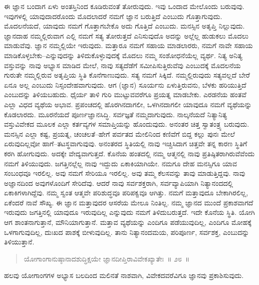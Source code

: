 ಈ ಜ್ಞಾನ ಬಂದಾಗ ಏಳು ಅಂತಸ್ತಿನಿಂದ ಕೂಡಿರುವಂತೆ ತೋರುವುದು. ಇವು ಒಂದಾದ ಮೇಲೊಂದು ಬರುವುವು. ಇವುಗಳಲ್ಲಿ ಯಾವುದಾದರೊಂದು ಮೊದಲಾದರೆ ನಮಗೆ ಜ್ಞಾನ ಬರುತ್ತಿದೆ ಎಂಬುದು ಗೊತ್ತಾಗುವುದು. ಮೊದಲನೆಯದೆ, ಯಾವುದು ನಮಗೆ ಗೊತ್ತಾಗಬೇಕೊ ಅದು ಗೊತ್ತಿದೆ ಎಂಬುದು. ಮನಸ್ಸಿನ ಅತೃಪ್ತಿ ನಿಲ್ಲುವುದು. ಜ್ಞಾನದಾಹ ನಮ್ಮಲ್ಲಿರುವಾಗ ಎಲ್ಲಿ ನಮಗೆ ಸತ್ಯ ತೋರುತ್ತದೆ ಎನಿಸುವುದೊ ಅದನ್ನು ಅಲ್ಲೆಲ್ಲ ಹುಡುಕಲು ಮೊದಲು ಮಾಡುವೆವು. ಜ್ಞಾನ ನಮ್ಮಲ್ಲಿಯೇ ಇರುವುದು. ಮತ್ತಾರೂ ನಮಗೆ ಸಹಾಯ ಮಾಡಲಾರರು, ನಮಗೆ ನಾವೇ ಸಹಾಯ ಮಾಡಿಕೊಳ್ಳಬೇಕು–ಎನ್ನುವುದನ್ನು ತಿಳಿದುಕೊಳ್ಳುವುದಕ್ಕೆ ಮೊದಲು ನಮ್ಮ ಸಂಶೋಧನೆಯೆಲ್ಲ ವ್ಯರ್ಥ. ನಿತ್ಯ ಅನಿತ್ಯ ವಸ್ತುವನ್ನು ನಾವು ಅಭ್ಯಾಸ ಮಾಡಿದ ಮೇಲೆ, ನಾವು ಸತ್ಯದೆಡೆಗೆ ಸಮೀಪಿಸುತ್ತಿರುವೆವು ಎಂಬುದಕ್ಕೆ ಮೊದಲನೆಯ ಗುರುತೇ ನಮ್ಮಲ್ಲಿರುವ ಅತೃಪ್ತಿಯ ಸ್ಥಿತಿ ಕೊನೆಗಾಣುವುದು. ಸತ್ಯ ನಮಗೆ ಸಿಕ್ಕಿದೆ. ನಮ್ಮಲ್ಲಿರುವುದು ಸತ್ಯವಲ್ಲದೆ ಬೇರೆ ಏನೂ ಅಲ್ಲ ಎಂಬುದು ನಿಸ್ಸಂದೇಹವಾಗುವುದು. ಆಗ (ಜ್ಞಾನ) ಸೂರ್ಯನು ಏಳುತ್ತಿರುವನು, ಬೆಳಕು ಹರಿಯುತ್ತಿದೆ ಎಂಬುದನ್ನು ತಿಳಿಯಬಹುದು. ಧೈರ್ಯ ತಾಳಿ ಗುರಿ ಮುಟ್ಟುವವರೆಗೂ ಪ್ರಯತ್ನ ಮಾಡಬೇಕು. ಎರಡನೆಯ ಹಂತವೆ ಎಲ್ಲಾ ವಿಧದ ವ್ಯಥೆಯ ಅಭಾವ. ಪ್ರಪಂಚದಲ್ಲಿ ಹೊರಗಿನದಾಗಲೀ, ಒಳಗಿನದಾಗಲೀ ಯಾವುದೂ ನಮಗೆ ವ್ಯಥೆಯನ್ನು ಕೊಡಲಾರದು. ಮೂರನೆಯದೆ ಪೂರ್ಣಜ್ಞಾನಸಿದ್ಧಿ. ಸರ್ವಜ್ಞತೆ ನಮ್ಮದಾಗುವುದು. ನಾಲ್ಕನೆಯದೆ ನಿತ್ಯಾನಿತ್ಯ ವಸ್ತುವಿವೇಕದ ಮೂಲಕ ಎಲ್ಲಾ ಕರ್ತವ್ಯಗಳ ಸಮಾಪ್ತಿಯನ್ನು ಹೊಂದುವುದು. ಅನಂತರ ಚಿತ್ತ ಸ್ವಾತಂತ್ರ್ಯ ಬರುವುದು. ಮನಸ್ಸಿನ ಎಲ್ಲಾ ಕಷ್ಟ, ಪ್ರಯತ್ನ, ಚಂಚಲತೆ–ಹೇಗೆ ಪರ್ವತದ ಮೇಲಿನಿಂದ ಕಣಿವೆಗೆ ಬಿದ್ದ ಕಲ್ಲು ಪುನಃ ಮೇಲೆ ಏರುವುದಿಲ್ಲವೋ ಹಾಗೆ–ತಟಸ್ಥವಾಗುವುವು. ಅನಂತರದ ಸ್ಥಿತಿಯಲ್ಲಿ ನಾವು ಇಚ್ಚಿಸಿದಾಗ ಚಿತ್ತವೇ ತನ್ನ ಕಾರಣ ಸ್ಥಿತಿಗೆ ಕರಗಿ ಹೋಗುವುದು. ಅದಕ್ಕೇ ವೇದ್ಯವಾಗುತ್ತದೆ. ಕೊನೆಯ ಹಂತದಲ್ಲಿ ನಮ್ಮ ಆತ್ಮನಲ್ಲಿ ನಾವು ಪ್ರತಿಷ್ಠಿತರಾಗಿರುವೆವೆಂದು ನಮಗೆ ತಿಳಿಯುವುದು. ಜಗತ್ತಿನಲ್ಲೆಲ್ಲ ನಾವು ಇದ್ದುದು ಏಕಾಕಿಯಾಗಿಯೇ. ನಮಗೂ ದೇಹ ಮನಸ್ಸಿಗೂ ಯಾವ ಸಂಬಂಧವೂ ಇರಲಿಲ್ಲ. ಅವು ನಮಗೆ ಸೇರಿಯೂ ಇರಲಿಲ್ಲ. ಅವು ತಮ್ಮ ಕೆಲಸವನ್ನು ತಾವು ಮಾಡುತ್ತಿದ್ದವು. ನಾವು ಅಜ್ಞಾನದಿಂದ ಅವುಗಳೊಂದಿಗೆ ಸೇರಿದೆವು. ಆದರೆ ನಾವು ಸರ್ವಶಕ್ತರಾಗಿ, ಸರ್ವವ್ಯಾಪಿಯಾಗಿ ನಿತ್ಯಾನಂದದಲ್ಲಿ ಏಕಾಕಿಗಳಾಗಿದ್ದೆವು. ನಮ್ಮ ಸ್ವಂತ ಆತ್ಮವೇ ಪರಿಶುದ್ಧವೂ ಪರಿಪಕ್ವವೂ ಆಗಿತ್ತು. ನಮಗೆ ಮತ್ತಾವುದೂ ಬೇಕಾಗಿರಲಿಲ್ಲ, ಏಕೆಂದರೆ ನಾವೆ ಸೌಖ್ಯ. ಈ ಜ್ಞಾನ ಮತ್ತಾವುದರ ಆಸರೆಯ ಮೇಲೂ ನಿಂತಿಲ್ಲ. ನಮ್ಮ ಜ್ಞಾನದ ಮುಂದೆ ಪ್ರಕಾಶವಾಗದೆ ಇರುವುದು ಜಗತ್ತಿನಲ್ಲಿ ಯಾವುದೂ ಇರುವುದಿಲ್ಲ ಎನ್ನುವುದು ನಮಗೆ ತಿಳಿದುಬರುತ್ತದೆ. ಇದೇ ಕೊನೆಯ ಸ್ಥಿತಿ. ಯೋಗಿ ಆಗ ಶಾಂತನಾಗುತ್ತಾನೆ, ಮೌನಿಯಾಗುತ್ತಾನೆ. ಮತ್ತಾವ ವ್ಯಥೆಯನ್ನು ಎಂದಿಗೂ ಪಡೆಯುವುದಿಲ್ಲ, ಎಂದಿಗೂ ಮೋಹಕ್ಕೆ ಒಳಗಾಗುವುದಿಲ್ಲ, ದುಃಖದ ಪಾಶಕ್ಕೆ ಬೀಳುವುದಿಲ್ಲ. ತಾನು ನಿತ್ಯಾನಂದಮಯ, ಪರಿಪೂರ್ಣ, ಸರ್ವಶಕ್ತ, ಎಂಬುದನ್ನು ತಿಳಿಯುತ್ತಾನೆ. 

\vspace{-0.3cm}

\begin{verse}
ಯೋಗಾಂಗಾನುಷ್ಠಾನಾದಶುದ್ಧಿಕ್ಷಯೇ ಜ್ಞಾನದೀಪ್ತಿರಾವಿವೇಕಖ್ಯಾತೇಃ~॥ ೨೮~॥
\end{verse}

\vspace{-0.3cm}

ಹಲವು ಯೋಗಾಂಗಗಳ ಅಭ್ಯಾಸ ಬಲದಿಂದ ಮಲಿನತೆ ನಾಶವಾಗಿ, ವಿವೇಕದವರೆವಿಗೂ ಜ್ಞಾನವು ಪ್ರಕಾಶಿಸುವುದು. 

